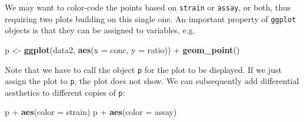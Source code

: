 \documentclass[]{book}
\newenvironment{Shaded}{}{}
\newcommand{\DataTypeTok}[1]{\textcolor[rgb]{0.56,0.13,0.00}{#1}}
\newcommand{\KeywordTok}[1]{\textcolor[rgb]{0.00,0.44,0.13}{\textbf{#1}}}
\newcommand{\NormalTok}[1]{#1}
\newcommand{\OperatorTok}[1]{\textcolor[rgb]{0.40,0.40,0.40}{#1}}
\newcommand{\StringTok}[1]{\textcolor[rgb]{0.25,0.44,0.63}{#1}}
\begin{document}
We may want to color-code the points based on \texttt{strain} or \texttt{assay}, or both, thus requiring two plots building on this single one. An important property of \texttt{ggplot} objects is that they can be assigned to variables, e.g.

\begin{Shaded}
\begin{Highlighting}[]
\NormalTok{p <-}\StringTok{ }\KeywordTok{ggplot}\NormalTok{(data2, }\KeywordTok{aes}\NormalTok{(}\DataTypeTok{x =}\NormalTok{ conc, }\DataTypeTok{y =}\NormalTok{ ratio)) }\OperatorTok{+}
\StringTok{  }\KeywordTok{geom_point}\NormalTok{()}
\end{Highlighting}
\end{Shaded}

Note that we have to call the object \texttt{p} for the plot to be displayed. If we just assign the plot to \texttt{p}, the plot does not show. We can subsequently add differential aesthetics to different copies of \texttt{p}:

\begin{Shaded}
\begin{Highlighting}[]
\NormalTok{p }\OperatorTok{+}\StringTok{ }\KeywordTok{aes}\NormalTok{(}\DataTypeTok{color =}\NormalTok{ strain)}
\NormalTok{p }\OperatorTok{+}\StringTok{ }\KeywordTok{aes}\NormalTok{(}\DataTypeTok{color =}\NormalTok{ assay)}
\end{Highlighting}
\end{Shaded}
\end{document}
